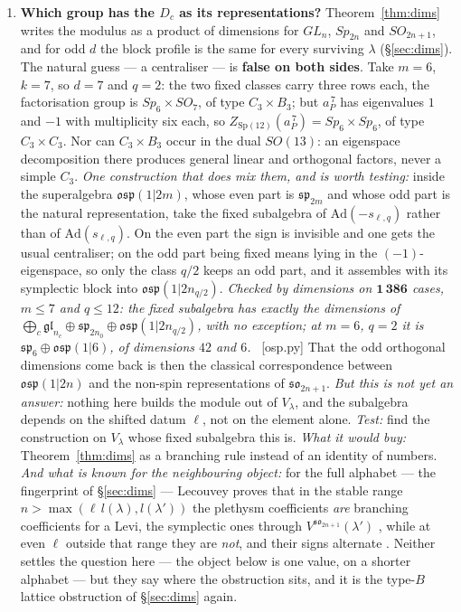 \documentclass[11pt,a4paper]{article}
\theoremstyle{definition}
\newcommand{\Sp}{\mathrm{Sp}}
\newcommand{\ver}[1]{\unskip\penalty0\ \textcolor{azul}{\small\textsf{[#1]}}}
\begin{document}
\begin{enumerate}
\item \textbf{Which group has the $D_c$ as its representations?}
Theorem~\ref{thm:dims} writes the modulus as a product of dimensions for $GL_n$, $Sp_{2n}$ and
$SO_{2n+1}$, and for odd $d$ the block profile is the same for every surviving $\lambda$
(\S\ref{sec:dims}). The natural guess --- a centraliser --- is \textbf{false on both sides}. Take
$m=6$, $k=7$, so $d=7$ and $q=2$: the two fixed classes carry three rows each, the factorisation
group is $Sp_6\times SO_7$, of type $C_3\times B_3$; but $a_P^{\,7}$ has eigenvalues $1$ and $-1$
with multiplicity six each, so $Z_{\Sp(12)}(a_P^{\,7})=Sp_6\times Sp_6$, of type $C_3\times C_3$.
Nor can $C_3\times B_3$ occur in the dual $SO(13)$: an eigenspace decomposition there produces
general linear and orthogonal factors, never a simple $C_3$. \emph{One construction that does mix them, and is worth testing:} inside the superalgebra
$\mathfrak{osp}(1|2m)$, whose even part is $\mathfrak{sp}_{2m}$ and whose odd part is the natural
representation, take the fixed subalgebra of $\mathrm{Ad}(-s_{\ell,q})$ rather than of
$\mathrm{Ad}(s_{\ell,q})$. On the even part the sign is invisible and one gets the usual
centraliser; on the odd part being fixed means lying in the $(-1)$-eigenspace, so only the class
$q/2$ keeps an odd part, and it assembles with its symplectic block into
$\mathfrak{osp}(1|2n_{q/2})$. \emph{Checked by dimensions on $\mathbf{1\,386}$ cases, $m\le7$ and
$q\le12$: the fixed subalgebra has exactly the dimensions of
$\bigoplus_c\mathfrak{gl}_{n_c}\oplus\mathfrak{sp}_{2n_0}\oplus\mathfrak{osp}(1|2n_{q/2})$, with no
exception; at $m=6$, $q=2$ it is $\mathfrak{sp}_6\oplus\mathfrak{osp}(1|6)$, of dimensions $42$ and
$6$.} \ver{osp.py} That the odd orthogonal dimensions come back is then the classical
correspondence between $\mathfrak{osp}(1|2n)$ and the non-spin representations of
$\mathfrak{so}_{2n+1}$. \emph{But this is not yet an answer:} nothing here builds the module out
of $V_\lambda$, and the subalgebra depends on the shifted datum $\ell$, not on the element alone.
\emph{Test:} find the construction on $V_\lambda$ whose fixed subalgebra this is. \emph{What it would buy:} Theorem~\ref{thm:dims} as a branching rule
instead of an identity of numbers.
\emph{And what is known for the neighbouring object:} for the full alphabet --- the fingerprint
of \S\ref{sec:dims} --- Lecouvey proves that in
the stable range $n>\max(\ell\,l(\lambda),l(\lambda'))$ the plethysm coefficients \emph{are}
branching coefficients for a Levi, the symplectic ones through $V^{\mathfrak{so}_{2n+1}}(\lambda')$
\cite[Thm.~4.5.1]{Lec07b}, while at even $\ell$ outside that range they are \emph{not}, and their
signs alternate \cite[Prop.~3.2.5]{Lec07a}. Neither settles the question here --- the object below
is one value, on a shorter alphabet --- but they say where the obstruction sits, and it is the
type-$B$ lattice obstruction of \S\ref{sec:dims} again.


\end{enumerate}
\end{document}
